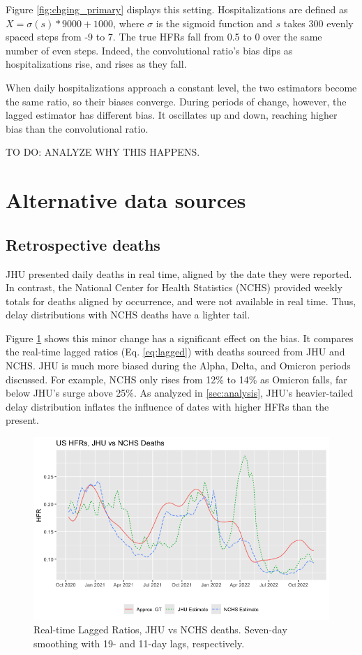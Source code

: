 \documentclass{article}
\begin{document}
Figure \ref{fig:chging_primary} displays this setting. Hospitalizations are defined as $X = \sigma(s)*9000+1000$, where $\sigma$ is the sigmoid function and $s$ takes 300 evenly spaced steps from -9 to 7. The true HFRs fall from 0.5 to 0 over the same number of even steps. Indeed, the convolutional ratio's bias dips as hospitalizations rise, and rises as they fall. 

When daily hospitalizations approach a constant level, the two estimators become the same ratio, so their biases converge. During periods of change, however, the lagged estimator has different bias. It oscillates up and down, reaching higher bias than the convolutional ratio. 

TO DO: ANALYZE WHY THIS HAPPENS.

\section{Alternative data sources}
\subsection{Retrospective deaths}\label{apx:NCHS_deaths}

JHU presented daily deaths in real time, aligned by the date they were reported. In contrast, the National Center for Health Statistics (NCHS) provided weekly totals for deaths aligned by occurrence, and were not available in real time. Thus, delay distributions with NCHS deaths have a lighter tail. 

Figure \ref{fig:jhu_vs_nchs} shows this minor change has a significant effect on the bias. It compares the real-time lagged ratios (Eq. \ref{eq:lagged}) with deaths sourced from JHU and NCHS. JHU is much more biased during the Alpha, Delta, and Omicron periods discussed. For example, NCHS only rises from 12\% to 14\% as Omicron falls, far below JHU's surge above 25\%. As analyzed in \ref{sec:analysis}, JHU's heavier-tailed delay distribution inflates the influence of dates with higher HFRs than the present.


\begin{figure}
    \centering
    \includegraphics[width=0.7\linewidth]{Figs/jhu_vs_nchs.png}
    \caption{Real-time Lagged Ratios, JHU vs NCHS deaths. Seven-day smoothing with 19- and 11-day lags, respectively.}
    \label{fig:jhu_vs_nchs}
\end{figure}
\end{document}
